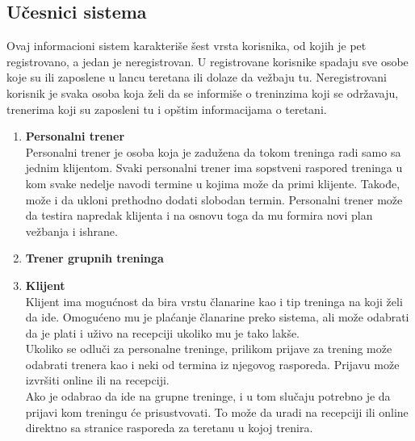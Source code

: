 \documentclass[../main.tex]{subfiles}
\begin{document}
\subsection{Učesnici sistema}
Ovaj informacioni sistem karakteriše šest vrsta korisnika, od kojih je pet registrovano, a jedan je neregistrovan. U registrovane korisnike spadaju sve osobe koje su ili zaposlene u lancu teretana ili dolaze da vežbaju tu. Neregistrovani korisnik je svaka osoba koja želi da se informiše o treninzima koji se održavaju, trenerima koji su zaposleni tu i opštim informacijama o teretani.
\begin{enumerate}
  \item \textbf{Personalni trener} \\
  Personalni trener je osoba koja je zadužena da tokom treninga radi samo sa jednim klijentom. Svaki personalni trener ima sopstveni raspored treninga u kom svake nedelje navodi termine u kojima može da primi klijente. Takođe, može i da ukloni prethodno dodati slobodan termin. Personalni trener može da testira napredak klijenta i na osnovu toga da mu formira novi plan vežbanja i ishrane.
  \item \textbf{Trener grupnih treninga} \\
  \item \textbf{Klijent} \\
  Klijent ima mogućnost da bira vrstu članarine kao i tip treninga na koji želi da ide. Omogućeno mu je plaćanje članarine preko sistema, ali može odabrati da je plati i uživo na recepciji ukoliko mu je tako lakše.\\ 
  Ukoliko se odluči za personalne treninge, prilikom prijave za trening može odabrati trenera kao i neki od termina iz njegovog rasporeda. Prijavu može izvršiti online ili na recepciji.\\
  Ako je odabrao da ide na grupne treninge, i u tom slučaju potrebno je da prijavi kom treningu će prisustvovati. To može da uradi na recepciji ili online direktno sa stranice rasporeda za teretanu u kojoj trenira. 
  

\end{enumerate}
\end{document}
